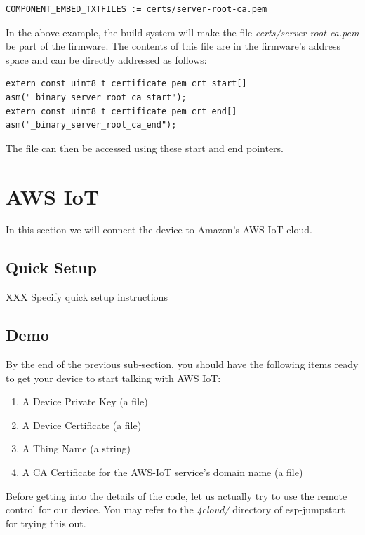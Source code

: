 \documentclass[main.tex]{subfiles}
\begin{document}
\begin{verbatim}
COMPONENT_EMBED_TXTFILES := certs/server-root-ca.pem 
\end{verbatim}

In the above example, the build system will make the file \textit{certs/server-root-ca.pem} be part of the firmware. The contents of this file are in the firmware's address space and can be directly addressed as follows:
\begin{verbatim}
extern const uint8_t certificate_pem_crt_start[] asm("_binary_server_root_ca_start");
extern const uint8_t certificate_pem_crt_end[] asm("_binary_server_root_ca_end");
\end{verbatim}

The file can then be accessed using these start and end pointers.

\section{AWS IoT}\label{sec:aws_cloud}
In this section we will connect the device to Amazon's AWS IoT cloud. 

\subsection{Quick Setup}
XXX Specify quick setup instructions

\subsection{Demo}
By the end of the previous sub-section, you should have the following items ready to get your device to start talking with AWS IoT:
\begin{enumerate}
    \item A Device Private Key (a file)
    \item A Device Certificate (a file)
    \item A Thing Name (a string)
    \item A CA Certificate for the AWS-IoT service's domain name (a file)
\end{enumerate}

Before getting into the details of the code, let us actually try to use the remote control for our device.
You may refer to the \textit{4cloud/} directory of esp-jumpstart for trying this out.
\end{document}
